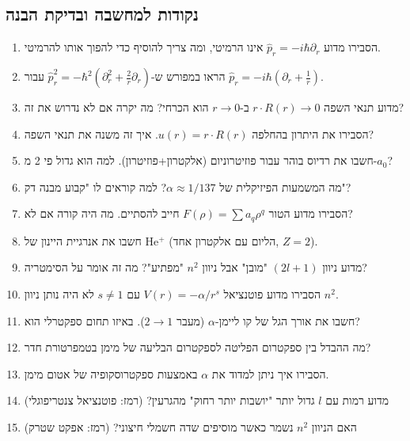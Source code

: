 \subsection*{נקודות למחשבה ובדיקת הבנה}

\begin{enumerate}
    \item הסבירו מדוע $\hat{p}_r = -i\hbar\partial_r$ אינו הרמיטי, ומה צריך להוסיף כדי להפוך אותו להרמיטי.
    
    \item הראו במפורש ש-$\hat{p}_r^2 = -\hbar^2(\partial_r^2 + \frac{2}{r}\partial_r)$ עבור $\hat{p}_r = -i\hbar(\partial_r + \frac{1}{r})$.
    
    \item מדוע תנאי השפה $r \cdot R(r) \to 0$ ב-$r \to 0$ הוא הכרחי? מה יקרה אם לא נדרוש את זה?
    
    \item הסבירו את היתרון בהחלפה $u(r) = r \cdot R(r)$. איך זה משנה את תנאי השפה?
    
    \item חשבו את רדיוס בוהר עבור פוזיטרוניום (אלקטרון+פוזיטרון). למה הוא גדול פי 2 מ-$a_0$?
    
    \item מה המשמעות הפיזיקלית של $\alpha \approx 1/137$? למה קוראים לו "קבוע מבנה דק"?
    
    \item הסבירו מדוע הטור $F(\rho) = \sum a_q \rho^q$ חייב להסתיים. מה היה קורה אם לא?
    
    \item חשבו את אנרגיית היינון של He$^+$ (הליום עם אלקטרון אחד, $Z=2$).
    
    \item מדוע ניוון $(2l+1)$ "מובן" אבל ניוון $n^2$ "מפתיע"? מה זה אומר על הסימטריה?
    
    \item הסבירו מדוע פוטנציאל $V(r) = -\alpha/r^s$ עם $s \neq 1$ לא היה נותן ניוון $n^2$.
    
    \item חשבו את אורך הגל של קו ליימן-$\alpha$ (מעבר $2 \to 1$). באיזו תחום ספקטרלי הוא?
    
    \item מה ההבדל בין ספקטרום הפליטה לספקטרום הבליעה של מימן בטמפרטורת חדר?
    
    \item הסבירו איך ניתן למדוד את $\alpha$ באמצעות ספקטרוסקופיה של אטום מימן.
    
    \item מדוע רמות עם $l$ גדול יותר "יושבות יותר רחוק" מהגרעין? (רמז: פוטנציאל צנטריפוגלי)
    
    \item האם הניוון $n^2$ נשמר כאשר מוסיפים שדה חשמלי חיצוני? (רמז: אפקט שטרק)
\end{enumerate}
